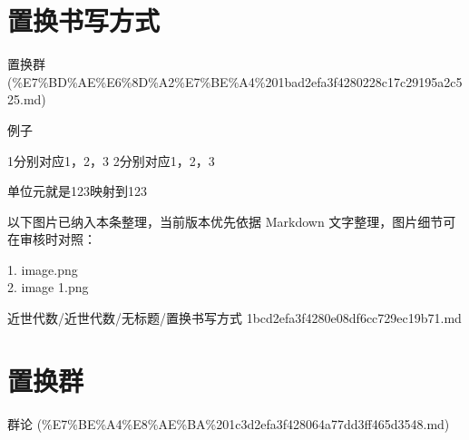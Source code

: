 \section*{置换书写方式}

\begin{note}[来源上级主题]

置换群 (\%E7\%BD\%AE\%E6\%8D\%A2\%E7\%BE\%A4\%201bad2efa3f4280228c17c29195a2c525.md)

\end{note}

\begin{note}[置换书写方式]

例子

1分别对应1，2，3    2分别对应1，2，3

单位元就是123映射到123

\end{note}

\begin{note}[关联图片]
以下图片已纳入本条整理，当前版本优先依据 Markdown 文字整理，图片细节可在审核时对照：

1. image.png\\
2. image 1.png\\

\end{note}

\begin{note}[来源路径]

近世代数/近世代数/无标题/置换书写方式 1bcd2efa3f4280e08df6cc729ec19b71.md

\end{note}

\section*{置换群}

\begin{note}[来源上级主题]

群论 (\%E7\%BE\%A4\%E8\%AE\%BA\%201c3d2efa3f428064a77dd3ff465d3548.md)

\end{note}

